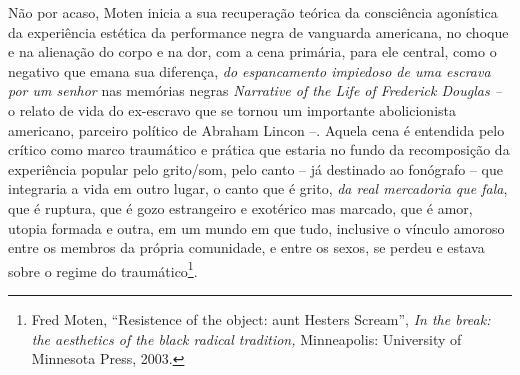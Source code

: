 Não por acaso, Moten inicia a sua recuperação teórica da consciência
agonística da experiência estética da performance negra de vanguarda
americana, no choque e na alienação do corpo e na dor, com a cena
primária, para ele central, como o negativo que emana sua diferença,
\emph{do espancamento impiedoso de uma escrava por um senhor} nas
memórias negras \emph{Narrative of the Life of Frederick Douglas --} o
relato de vida do ex-escravo que se tornou um importante abolicionista
americano, parceiro político de Abraham Lincon --. Aquela cena é
entendida pelo crítico como marco traumático e prática que estaria no
fundo da recomposição da experiência popular pelo grito/som, pelo canto
-- já destinado ao fonógrafo -- que integraria a vida em outro lugar, o
canto que é grito, \emph{da real mercadoria que fala}, que é ruptura,
que é gozo estrangeiro e exotérico mas marcado, que é amor, utopia
formada e outra, em um mundo em que tudo, inclusive o vínculo amoroso
entre os membros da própria comunidade, e entre os sexos, se perdeu e
estava sobre o regime do traumático\footnote{Fred Moten, ``Resistence of
  the object: aunt Hesters Scream'', \emph{In the break: the aesthetics
  of the black radical tradition,} Minneapolis: University of Minnesota
  Press, 2003.}.

